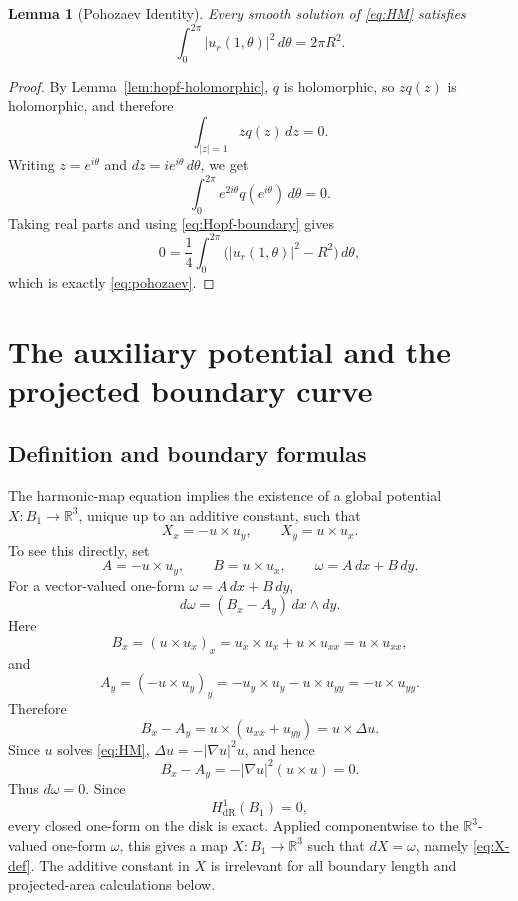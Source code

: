 \documentclass[11pt]{amsart}
\numberwithin{equation}{section}
\newtheorem{lemma}[theorem]{Lemma}
\theoremstyle{remark}
\newcommand{\R}{\mathbb{R}}
\begin{document}
\begin{lemma}[Pohozaev Identity]\label{lem:pohozaev}
Every smooth solution of \eqref{eq:HM} satisfies
\begin{equation}\label{eq:pohozaev}
\int_0^{2\pi}|u_r(1,\theta)|^2\,d\theta=2\pi R^2.
\end{equation}
\end{lemma}

\begin{proof}
By Lemma~\ref{lem:hopf-holomorphic}, $q$ is holomorphic, so $zq(z)$ is holomorphic, and therefore
\[
\int_{|z|=1}zq(z)\,dz=0.
\]
Writing $z=e^{i\theta}$ and $dz=ie^{i\theta}\,d\theta$, we get
\[
\int_0^{2\pi}e^{2i\theta}q(e^{i\theta})\,d\theta=0.
\]
Taking real parts and using \eqref{eq:Hopf-boundary} gives
\[
0=\frac14\int_0^{2\pi}\bigl(|u_r(1,\theta)|^2-R^2\bigr)\,d\theta,
\]
which is exactly \eqref{eq:pohozaev}.
\end{proof}

\section{The auxiliary potential and the projected boundary curve}\label{sec:auxiliary}

\subsection{Definition and boundary formulas}

The harmonic-map equation implies the existence of a global potential $X\colon B_1\to\R^3$, unique up to an additive constant, such that
\begin{equation}\label{eq:X-def}
X_x=-u\times u_y,
\qquad
X_y=u\times u_x.
\end{equation}
To see this directly, set
\[
A=-u\times u_y,\qquad B=u\times u_x,\qquad \omega=A\,dx+B\,dy.
\]
For a vector-valued one-form \(\omega=A\,dx+B\,dy\),
\[
d\omega=(B_x-A_y)\,dx\wedge dy.
\]
Here
\[
B_x=(u\times u_x)_x=u_x\times u_x+u\times u_{xx}=u\times u_{xx},
\]
and
\[
A_y=(-u\times u_y)_y=-u_y\times u_y-u\times u_{yy}=-u\times u_{yy}.
\]
Therefore
\[
B_x-A_y=u\times(u_{xx}+u_{yy})=u\times\Delta u.
\]
Since \(u\) solves \eqref{eq:HM}, \(\Delta u=-|\nabla u|^2u\), and hence
\[
B_x-A_y=-|\nabla u|^2(u\times u)=0.
\]
Thus \(d\omega=0\). Since
\[
H^1_{\mathrm{dR}}(B_1)=0,
\]
every closed one-form on the disk is exact. Applied componentwise to the \(\R^3\)-valued one-form \(\omega\), this gives a map \(X\colon
B_1\to\R^3\) such that \(dX=\omega\), namely \eqref{eq:X-def}. The additive constant in \(X\) is irrelevant for all boundary length and
projected-area calculations below.
\end{document}
